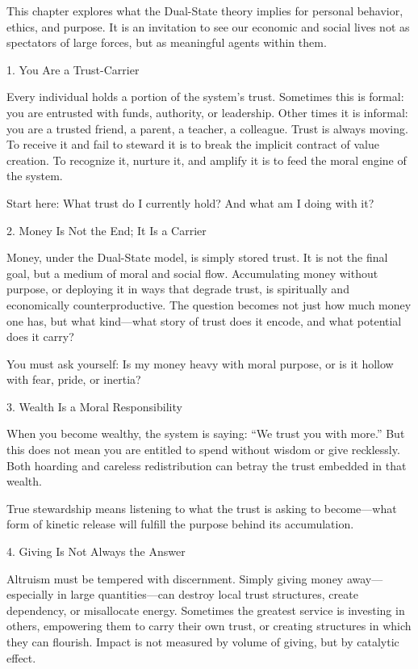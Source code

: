 \documentclass[11pt,oneside]{book}
\begin{document}
This chapter explores what the Dual-State theory implies for personal behavior, ethics, and purpose. It is an invitation to see our economic and social lives not as spectators of large forces, but as meaningful agents within them.

1. You Are a Trust-Carrier


Every individual holds a portion of the system’s trust. Sometimes this is formal: you are entrusted with funds, authority, or leadership. Other times it is informal: you are a trusted friend, a parent, a teacher, a colleague. Trust is always moving. To receive it and fail to steward it is to break the implicit contract of value creation. To recognize it, nurture it, and amplify it is to feed the moral engine of the system.

Start here: What trust do I currently hold? And what am I doing with it?

2. Money Is Not the End; It Is a Carrier


Money, under the Dual-State model, is simply stored trust. It is not the final goal, but a medium of moral and social flow. Accumulating money without purpose, or deploying it in ways that degrade trust, is spiritually and economically counterproductive. The question becomes not just how much money one has, but what kind—what story of trust does it encode, and what potential does it carry?

You must ask yourself: Is my money heavy with moral purpose, or is it hollow with fear, pride, or inertia?

3. Wealth Is a Moral Responsibility


When you become wealthy, the system is saying: “We trust you with more.” But this does not mean you are entitled to spend without wisdom or give recklessly. Both hoarding and careless redistribution can betray the trust embedded in that wealth.

True stewardship means listening to what the trust is asking to become—what form of kinetic release will fulfill the purpose behind its accumulation.

4. Giving Is Not Always the Answer


Altruism must be tempered with discernment. Simply giving money away—especially in large quantities—can destroy local trust structures, create dependency, or misallocate energy. Sometimes the greatest service is investing in others, empowering them to carry their own trust, or creating structures in which they can flourish. Impact is not measured by volume of giving, but by catalytic effect.
\end{document}
